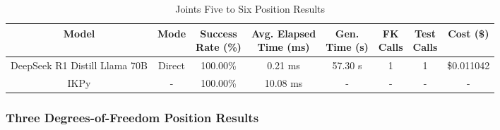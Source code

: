 \begin{landscape}
\begin{table}[H]
\tiny
\renewcommand{\arraystretch}{1.2}
\caption{Joints Five to Six Position Results}
\begin{center}
\begin{tabular}{|c|c|c|c|c|c|c|c|}
    \hline
    \textbf{Model} & 
    \textbf{Mode} & 
    \makecell{\textbf{Success}\\\textbf{Rate (\%)}} &
    \makecell{\textbf{Avg. Elapsed}\\\textbf{Time (ms)}} &
    \makecell{\textbf{Gen.}\\\textbf{Time (s)}} &
    \makecell{\textbf{FK}\\\textbf{Calls}} &
    \makecell{\textbf{Test}\\\textbf{Calls}} &
    \textbf{Cost (\$)} \\
    \hline
    DeepSeek R1 Distill Llama 70B & Direct & 100.00\% & 0.21 ms & 57.30 s & 1 & 1 & \$0.011042 \\
    \hline
    IKPy & - & 100.00\% & 10.08 ms & - & - & - & - \\
    \hline
\end{tabular}
\label{Results-Position-5-6}
\end{center}
\end{table}

\subsubsection{Three Degrees-of-Freedom Position Results}


\end{landscape}
